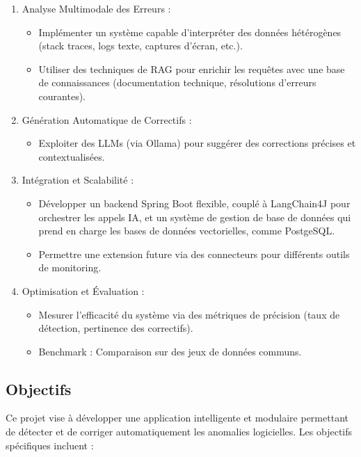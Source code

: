 \documentclass[12pt,a4paper]{report}
\begin{document}
	\begin{enumerate}
		\item Analyse Multimodale des Erreurs :
		\begin{itemize}
			\item Implémenter un système capable d’interpréter des données hétérogènes (stack traces, logs texte, captures d’écran, etc.).
			\item Utiliser des techniques de RAG pour enrichir les requêtes avec une base de connaissances (documentation technique, résolutions d’erreurs courantes).
		\end{itemize}
		
		\item Génération Automatique de Correctifs :
		\begin{itemize}
			\item Exploiter des LLMs (via Ollama) pour suggérer des corrections précises et contextualisées.
		\end{itemize}
		
		\item Intégration et Scalabilité :
		\begin{itemize}
			\item Développer un backend Spring Boot flexible, couplé à LangChain4J pour orchestrer les appels IA, et un système de gestion de base de données qui prend en charge les bases de données vectorielles, comme PostgeSQL.
			
			\item Permettre une extension future via des connecteurs pour différents outils de monitoring.
		\end{itemize}
		
		\item Optimisation et Évaluation :
		\begin{itemize}
			\item Mesurer l’efficacité du système via des métriques de précision (taux de détection, pertinence des correctifs).
			
			\item Benchmark : Comparaison sur des jeux de données communs.
		\end{itemize}
	\end{enumerate}
	
	\subsection{Objectifs}
	
	Ce projet vise à développer une application intelligente et modulaire permettant de détecter et de corriger automatiquement les anomalies logicielles. Les objectifs spécifiques incluent :
	
\end{document}
